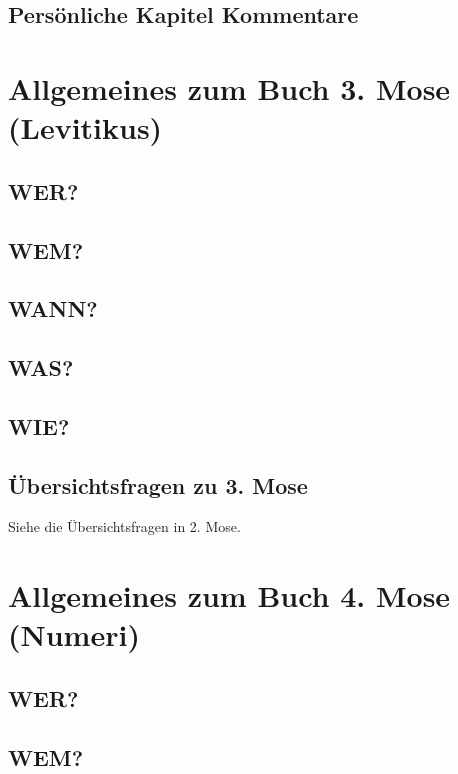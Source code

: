 \subsection{Persönliche Kapitel Kommentare}
    
\section{Allgemeines zum Buch 3. Mose (Levitikus)}
\subsection{WER?}
\subsection{WEM?}
\subsection{WANN?}
\subsection{WAS?}
\subsection{WIE?}
\subsection{Übersichtsfragen zu 3. Mose}
    Siehe die Übersichtsfragen in 2. Mose.
\section{Allgemeines zum Buch 4. Mose (Numeri)}
\subsection{WER?}
\subsection{WEM?}
